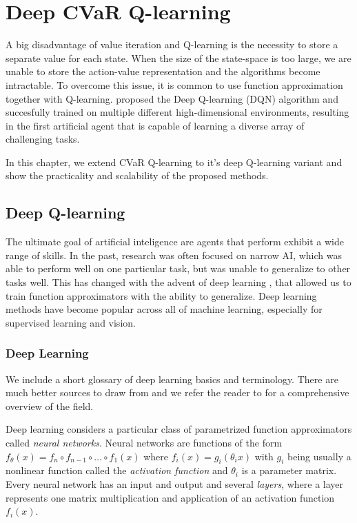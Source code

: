 \chapter{Deep CVaR Q-learning}\label{ch:dqn}

A big disadvantage of value iteration and Q-learning is the necessity to store a separate value for each state. When the size of the state-space is too large, we are unable to store the action-value representation and the algorithms become intractable. To overcome this issue, it is common to use function approximation together with Q-learning. \citet{mnih2015human} proposed the Deep Q-learning (DQN) algorithm and succesfully trained on multiple different high-dimensional environments, resulting in the first artificial agent that is capable of learning a diverse array of challenging tasks.

In this chapter, we extend CVaR Q-learning to it's deep Q-learning variant and show the practicality and scalability of the proposed methods.

\section{Deep Q-learning}
The ultimate goal of artificial inteligence are agents that perform exhibit a wide range of skills. In the past, research was often focused on narrow AI, which was able to perform well on one particular task, but was unable to generalize to other tasks well. This has changed with the advent of deep learning \citep{krizhevsky2012imagenet}, that allowed us to train function approximators with the ability to generalize. Deep learning methods have become popular across all of machine learning, especially for supervised learning and vision.

\subsection{Deep Learning}

We include a short glossary of deep learning basics and terminology. There are much better sources to draw from and we refer the reader to \citet{goodfellow2016deep} for a comprehensive overview of the field.

Deep learning considers a particular class of parametrized function approximators called \textit{neural networks}. 
Neural networks are functions of the form $f_\theta(x) = f_n \circ f_{n-1} \circ\hdots\circ  f_1(x)$ where $f_i(x) = g_i(\theta_i x)$ with $g_i$ being usually a nonlinear function called the \textit{activation function} and $\theta_i$ is a parameter matrix. Every neural network has an input and output and several \textit{layers}, where a layer represents one matrix multiplication and application of an activation function $f_i(x)$.

